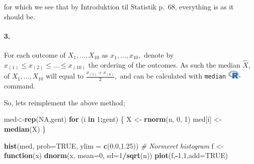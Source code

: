 \documentclass[
]{article}
\newenvironment{Shaded}{\begin{snugshade}}{\end{snugshade}}
\newcommand{\CommentTok}[1]{\textcolor[rgb]{0.56,0.35,0.01}{\textit{#1}}}
\newcommand{\ControlFlowTok}[1]{\textcolor[rgb]{0.13,0.29,0.53}{\textbf{#1}}}
\newcommand{\DataTypeTok}[1]{\textcolor[rgb]{0.13,0.29,0.53}{#1}}
\newcommand{\DecValTok}[1]{\textcolor[rgb]{0.00,0.00,0.81}{#1}}
\newcommand{\FloatTok}[1]{\textcolor[rgb]{0.00,0.00,0.81}{#1}}
\newcommand{\KeywordTok}[1]{\textcolor[rgb]{0.13,0.29,0.53}{\textbf{#1}}}
\newcommand{\NormalTok}[1]{#1}
\newcommand{\OperatorTok}[1]{\textcolor[rgb]{0.81,0.36,0.00}{\textbf{#1}}}
\newcommand{\OtherTok}[1]{\textcolor[rgb]{0.56,0.35,0.01}{#1}}
\newcommand{\StringTok}[1]{\textcolor[rgb]{0.31,0.60,0.02}{#1}}
\begin{document}
for which we see that by Introduktion til Statistik p.~68, everything is
as it should be.

\hypertarget{section-25}{%
\paragraph{\texorpdfstring{\textbf{3.}}{3.}}\label{section-25}}

For each outcome of \(X_1,\ldots,X_{10}\) as \(x_1,\ldots,x_{10},\)
denote by \(x_{(1)}\leq x_{(2)}\leq\ldots\leq x_{(10)}\) the ordering of
the outcomes. As such the median \(\widehat{X},\) of
\(X_1,\ldots,X_{10}\) will equal to \(\frac{x_{(5)}+x_{(6)}}{2},\) and
can be calculated with \texttt{median}
\includegraphics[width=\textwidth,height=0.16667in]{R_logo.png}-command.

So, lets reimplement the above method;

\begin{Shaded}
\begin{Highlighting}[]
\NormalTok{med<-}\KeywordTok{rep}\NormalTok{(}\OtherTok{NA}\NormalTok{,gent)}
\ControlFlowTok{for}\NormalTok{ (i }\ControlFlowTok{in} \DecValTok{1}\OperatorTok{:}\NormalTok{gent) \{}
\NormalTok{   X <-}\StringTok{ }\KeywordTok{rnorm}\NormalTok{(n, }\DecValTok{0}\NormalTok{, }\DecValTok{1}\NormalTok{)}
\NormalTok{   med[i] <-}\StringTok{ }\KeywordTok{median}\NormalTok{(X)}
\NormalTok{\}}
\end{Highlighting}
\end{Shaded}

\begin{Shaded}
\begin{Highlighting}[]
\KeywordTok{hist}\NormalTok{(med, }\DataTypeTok{prob=}\OtherTok{TRUE}\NormalTok{, }\DataTypeTok{ylim =} \KeywordTok{c}\NormalTok{(}\FloatTok{0.0}\NormalTok{,}\FloatTok{1.25}\NormalTok{)) }\CommentTok{# Normeret histogram}
\NormalTok{f <-}\StringTok{ }\ControlFlowTok{function}\NormalTok{(x) }\KeywordTok{dnorm}\NormalTok{(x, }\DataTypeTok{mean=}\DecValTok{0}\NormalTok{, }\DataTypeTok{sd=}\DecValTok{1}\OperatorTok{/}\KeywordTok{sqrt}\NormalTok{(n))}
\KeywordTok{plot}\NormalTok{(f,}\OperatorTok{-}\DecValTok{1}\NormalTok{,}\DecValTok{1}\NormalTok{,}\DataTypeTok{add=}\OtherTok{TRUE}\NormalTok{)}
\end{Highlighting}
\end{Shaded}
\end{document}
